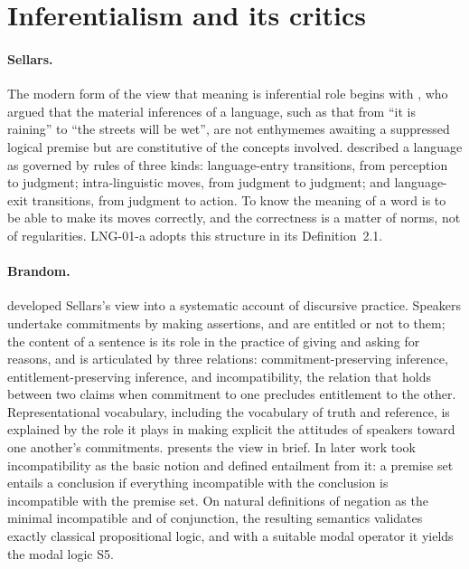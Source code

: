 \documentclass{situationist-preprint}
\begin{document}
\section{Inferentialism and its critics}\label{s:history}

\paragraph{Sellars.} The modern form of the view that meaning is inferential role begins with \citet{Sellars1953}, who argued that the material inferences of a language, such as that from \enquote{it is raining} to \enquote{the streets will be wet}, are not enthymemes awaiting a suppressed logical premise but are constitutive of the concepts involved. \citet{Sellars1954} described a language as governed by rules of three kinds: language-entry transitions, from perception to judgment; intra-linguistic moves, from judgment to judgment; and language-exit transitions, from judgment to action. To know the meaning of a word is to be able to make its moves correctly, and the correctness is a matter of norms, not of regularities. LNG-01-a adopts this structure in its Definition~2.1.

\paragraph{Brandom.} \citet{Brandom1994} developed Sellars's view into a systematic account of discursive practice. Speakers undertake commitments by making assertions, and are entitled or not to them; the content of a sentence is its role in the practice of giving and asking for reasons, and is articulated by three relations: commitment-preserving inference, entitlement-preserving inference, and incompatibility, the relation that holds between two claims when commitment to one precludes entitlement to the other. Representational vocabulary, including the vocabulary of truth and reference, is explained by the role it plays in making explicit the attitudes of speakers toward one another's commitments. \citet{Brandom2000} presents the view in brief. In later work \citet[ch.~5]{Brandom2008} took incompatibility as the basic notion and defined entailment from it: a premise set entails a conclusion if everything incompatible with the conclusion is incompatible with the premise set. On natural definitions of negation as the minimal incompatible and of conjunction, the resulting semantics validates exactly classical propositional logic, and with a suitable modal operator it yields the modal logic S5.
\end{document}
